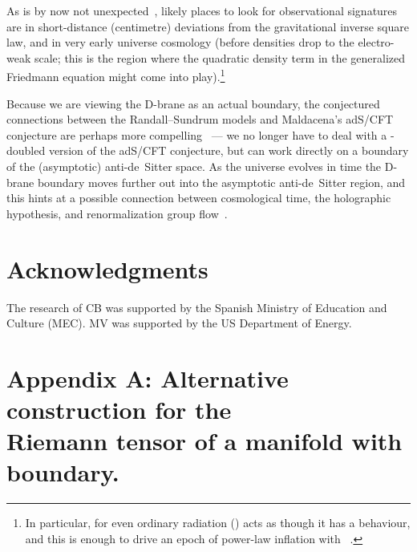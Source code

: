 \documentclass[a4paper,12pt]{article}
\begin{document}
As is by now not unexpected~\cite{RS1,RS2,RS-cosmology}, likely
places to look for observational signatures are in short-distance
(centimetre) deviations from the gravitational inverse square law, and
in very early universe cosmology (before densities drop to the
electro-weak scale; this is the region where the quadratic density
term in the generalized Friedmann equation might come into
play).\footnote{
In particular, for \coordHE{} even ordinary radiation
(\coordHE{}) acts as though it has a \coordHE{} behaviour, and
this is enough to drive an epoch of power-law inflation with
\coordHE{}~\cite{RS-cosmology}.}

Because we are viewing the D-brane as an actual boundary, the
conjectured connections between the Randall--Sundrum models and
Maldacena's adS/CFT conjecture are perhaps more
compelling~\cite{adS/CFT,RS-adS/CFT} --- we no longer have to deal
with a \coordHE{}-doubled version of the adS/CFT conjecture, but can work
directly on a boundary of the (asymptotic) anti-de~Sitter space. As
the universe evolves in time the D-brane boundary moves further out
into the asymptotic anti-de~Sitter region, and this hints at a
possible connection between cosmological time, the holographic
hypothesis, and renormalization group flow~\cite{RS-adS/CFT}.

\section*{Acknowledgments}

The research of CB was supported by the Spanish Ministry of Education
and Culture (MEC). MV was supported by the US Department of Energy.

\appendix
\section*{Appendix A: Alternative construction for the \\
Riemann tensor of a manifold with boundary.}
\end{document}
